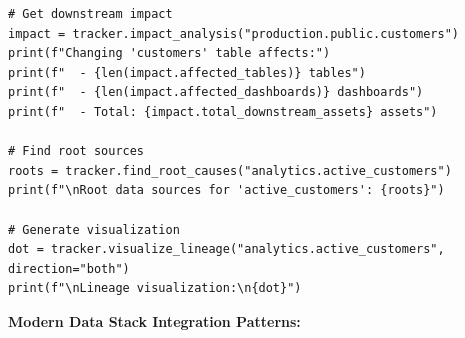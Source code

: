 \begin{lstlisting}[style=python, caption=LineageTracker with Column-Level Dependencies]
# Get downstream impact
impact = tracker.impact_analysis("production.public.customers")
print(f"Changing 'customers' table affects:")
print(f"  - {len(impact.affected_tables)} tables")
print(f"  - {len(impact.affected_dashboards)} dashboards")
print(f"  - Total: {impact.total_downstream_assets} assets")

# Find root sources
roots = tracker.find_root_causes("analytics.active_customers")
print(f"\nRoot data sources for 'active_customers': {roots}")

# Generate visualization
dot = tracker.visualize_lineage("analytics.active_customers", direction="both")
print(f"\nLineage visualization:\n{dot}")
\end{lstlisting}

\textbf{Modern Data Stack Integration Patterns:}


